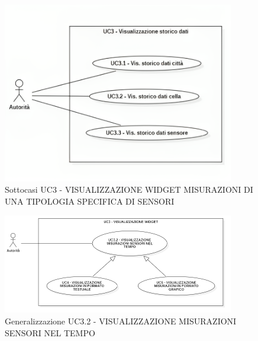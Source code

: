 \begin{figure}[H]
    \centering
    \includegraphics[width=0.9\textwidth]{../Images/uc3_Subcase.png}
    \caption{Sottocasi UC3 - VISUALIZZAZIONE WIDGET MISURAZIONI DI UNA TIPOLOGIA SPECIFICA DI SENSORI}
    \label{fig:UC3_sub}
\end{figure}





\begin{figure}[H]
    \centering
    \includegraphics[width=0.9\textwidth]{../Images/uc3_1Gen.PNG}
    \caption{Generalizzazione UC3.2 - VISUALIZZAZIONE MISURAZIONI SENSORI NEL TEMPO}
    \label{fig:UC3_gen}
\end{figure}



